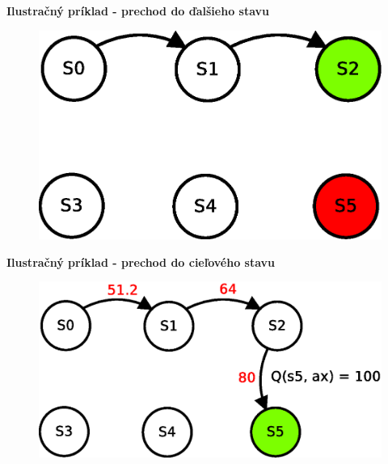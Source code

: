 \documentclass[xcolor=dvipsnames]{beamer}
\begin{document}
\begin{frame}{\bf Ilustračný príklad - prechod do ďalšieho stavu}

\begin{figure}[!htb]
\includegraphics[scale=.5]{../diagrams/q_learning_table_03.eps}
\end{figure}

\end{frame}

\begin{frame}{\bf Ilustračný príklad - prechod do cieľového stavu}

\begin{figure}[!htb]
\includegraphics[scale=.5]{../diagrams/q_learning_table_04.eps}
\end{figure}

\end{frame}
\end{document}

